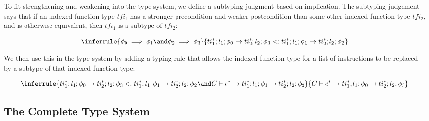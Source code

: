 
To fit strengthening and weakening into the type system, we define a subtyping judgment based on implication.
The subtyping judgement says that if an indexed function type $tfi_1$ has a stronger precondition and weaker postcondition than some other indexed function type $tfi_2$, and is otherwise equivalent, then $tfi_1$ is a subtype of $tfi_2$:

\[
    \inferrule{
        \phi_0 \implies \phi_1 \and
        \phi_2 \implies \phi_3
    }{
        ti_1^{*};l_1;\phi_0 \rightarrow ti_2^{*};l_2;\phi_3 <: ti_1^{*};l_1;\phi_1 \rightarrow ti_2^{*};l_2;\phi_2
    }
\]

We then use this in the \name type system by adding a typing rule that allows the indexed function type for a list of instructions to be replaced by a subtype of that indexed function type:

\[
    \inferrule{
        ti_1^{*};l_1;\phi_0 \rightarrow ti_2^{*};l_2;\phi_3 <: ti_1^{*};l_1;\phi_1 \rightarrow ti_2^{*};l_2;\phi_2 \and
        C \vdash e^{*} \rightarrow ti_1^{*};l_1;\phi_1 \rightarrow ti_2^{*};l_2;\phi_2
    }{
        C \vdash e^{*} \rightarrow ti_1^{*};l_1;\phi_0 \rightarrow ti_2^{*};l_2;\phi_3
    }
\]

\subsection{The Complete \name Type System}


